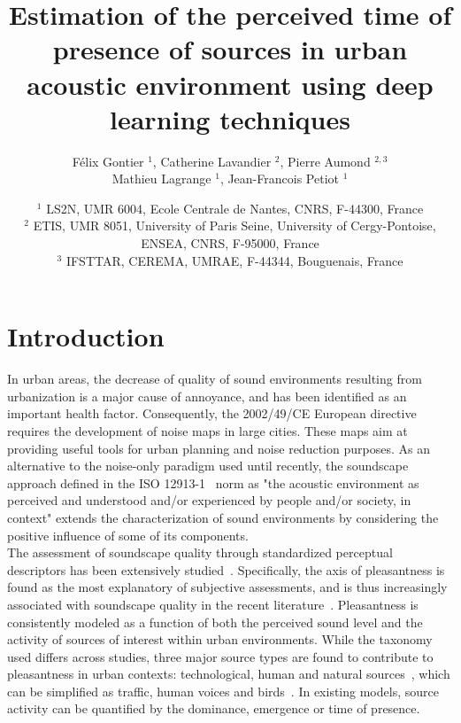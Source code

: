 \documentclass[11pt,a4paper]{article}
\begin{document}
\author{F\'elix Gontier $^1$, Catherine Lavandier $^2$, Pierre Aumond $^{2, 3}$\\Mathieu Lagrange $^1$, Jean-Francois Petiot $^1$}
\date{
$^1$ LS2N, UMR 6004, Ecole Centrale de Nantes, CNRS, F-44300, France\\
$^2$ ETIS, UMR 8051, University of Paris Seine, University of Cergy-Pontoise, ENSEA, CNRS, F-95000, France\\
$^3$ IFSTTAR, CEREMA, UMRAE, F-44344, Bouguenais, France
}
\title{Estimation of the perceived time of presence of sources in urban acoustic environment using deep learning techniques}
\maketitle


\begin{abstract}

\end{abstract}


\section{Introduction}
\label{sec:intro}

In urban areas, the decrease of quality of sound environments resulting from urbanization is a major cause of annoyance, and has been identified as an important health factor. Consequently, the 2002/49/CE European directive~\cite{ec2002} requires the development of noise maps in large cities. These maps aim at providing useful tools for urban planning and noise reduction purposes. As an alternative to the noise-only paradigm used until recently, the soundscape approach defined in the ISO 12913-1~\cite{iso2014} norm as "the acoustic environment as perceived and understood and/or experienced by people and/or society, in context" extends the characterization of sound environments by considering the positive influence of some of its components.\\

The assessment of soundscape quality through standardized perceptual descriptors has been extensively studied~\cite{viollon2000, axelsson2010, cain2013, jeon2018, aletta2016}. Specifically, the axis of pleasantness is found as the most explanatory of subjective assessments, and is thus increasingly associated with soundscape quality in the recent literature~\cite{axelsson2010, aumond2017, delaitre2014}. Pleasantness is consistently modeled as a function of both the perceived sound level and the activity of sources of interest within urban environments. While the taxonomy used differs across studies, three major source types are found to contribute to pleasantness in urban contexts: technological, human and natural sources~\cite{nilsson2007, axelsson2010}, which can be simplified as traffic, human voices and birds~\cite{lavandier2006, ricciardi2014, aumond2017}. In existing models, source activity can be quantified by the dominance, emergence or time of presence.\\
\end{document}
